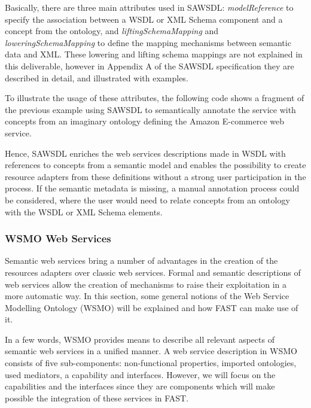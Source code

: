 \documentclass{fast_latex}
\begin{document}
Basically, there are three main attributes used in SAWSDL: \emph{modelReference} to specify the association between a WSDL or XML Schema component and a concept from the ontology, and \emph{liftingSchemaMapping} and \emph{loweringSchemaMapping} to define the mapping mechanisms between semantic data and XML. These lowering and lifting schema mappings are not explained in this deliverable, however in Appendix A of the SAWSDL specification \cite{sawsdl} they are described in detail, and illustrated with examples.

To illustrate the usage of these attributes, the following code shows a fragment of the previous example using SAWSDL to semantically annotate the service with concepts from an imaginary ontology defining the Amazon E-commerce web service.

\singlespacing
\begin{small}

\end{small}
\doublespacing

Hence, SAWSDL enriches the web services descriptions made in WSDL with references to concepts from a semantic model and enables the possibility to create resource adapters from these definitions without a strong user participation in the process. If the semantic metadata is missing, a manual annotation process could be considered, where the user would need to relate concepts from an ontology with the WSDL or XML Schema elements.


\subsubsection{WSMO Web Services} %
\label{ssub:wsmo_web_services}

Semantic web services bring a number of advantages in the creation of the resources adapters over classic web services. Formal and semantic descriptions of web services allow the creation of mechanisms to raise their exploitation in a more automatic way. In this section, some general notions of the Web Service Modelling Ontology (WSMO) will be explained and how FAST can make use of it.

In a few words, WSMO provides means to describe all relevant aspects of semantic web services in a unified manner. A web service description in WSMO consists of five sub-components: non-functional properties, imported ontologies, used mediators, a capability and interfaces. However, we will focus on the capabilities and the interfaces since they are components which will make possible the integration of these services in FAST.
\end{document}

